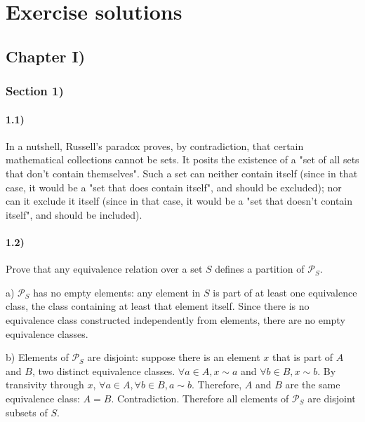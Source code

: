 \documentclass[12pt, letterpaper, twoside]{report}
\begin{document}

\author{Multiversity \textit{Algebra Chapter 0} Reading Group}
\part{Exercise solutions}
\chapter*{Chapter I)}

\section*{Section 1)}

\subsection*{1.1)}

In a nutshell, Russell's paradox proves, by contradiction, that certain mathematical collections cannot be sets. It posits the existence of a "set of all sets that don't contain themselves". Such a set can neither contain itself (since in that case, it would be a "set that does contain itself", and should be excluded); nor can it exclude it itself (since in that case, it would be a "set that doesn't contain itself", and should be included).



\subsection*{1.2)}

Prove that any equivalence relation over a set $S$ defines a partition of $\mathcal{P}_S$.

a) $\mathcal{P}_S$ has no empty elements: any element in $S$ is part of at least one equivalence class, the class containing at least that element itself. Since there is no equivalence class constructed independently from elements, there are no empty equivalence classes.

b) Elements of $\mathcal{P}_S$ are disjoint: suppose there is an element $x$ that is part of $A$ and $B$, two distinct equivalence classes. $\forall a \in A, x \sim a$ and $\forall b \in B, x \sim b$. By transivity through $x$, $\forall a \in A, \forall b \in B, a \sim b$. Therefore, $A$ and $B$ are the same equivalence class: $A = B$. Contradiction. Therefore all elements of $\mathcal{P}_S$ are disjoint subsets of $S$.
\end{document}
